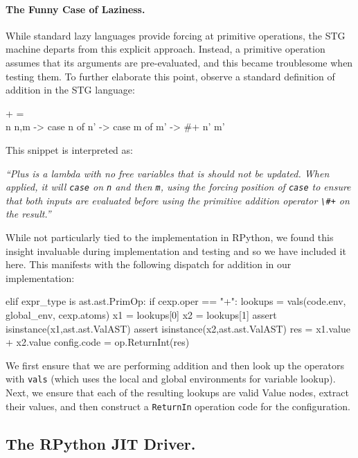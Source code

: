 \documentclass[preprint]{sigplanconf}
\begin{document}
\paragraph{The Funny Case of Laziness.}
While standard lazy languages provide forcing at primitive operations, the
STG machine departs from this explicit approach. Instead, a primitive operation
assumes that its arguments are pre-evaluated, and this became troublesome when
testing them. To further elaborate this point, observe a standard definition
of addition in the STG language:
\begin{code}[language=Haskell]
+ = \ {} \\n {n,m} -> case n of
                        n' -> case m of
                                m' -> #+ n' m'
\end{code}
This snippet is interpreted as: 
\begin{center}
\emph{
``Plus is a lambda with no free variables that
is should not be updated. When applied, it will \lstinline{case} on
\lstinline{n} and then \lstinline{m}, using the forcing position of
\lstinline{case} to ensure that both inputs are evaluated before using the
primitive addition operator \lstinline{\#+} on the result.''
}
\end{center}
While not particularly tied to the implementation in RPython, we found this
insight invaluable during implementation and testing and so we have included
it here. This manifests with the following dispatch for addition in our
implementation:
\begin{code}
elif expr_type is ast.ast.PrimOp:
  if cexp.oper == "+":
    lookups = vals(code.env,
                   global_env, 
                   cexp.atoms)
    x1      = lookups[0]
    x2      = lookups[1]
    assert isinstance(x1,ast.ast.ValAST)
    assert isinstance(x2,ast.ast.ValAST)
    res     = x1.value + x2.value
    config.code = op.ReturnInt(res) 
\end{code}
We first ensure that we are performing addition and then look up the operators
with \lstinline{vals} (which uses the local and global environments for variable
lookup). Next, we ensure that each of the resulting lookups are valid Value
nodes, extract their values, and then construct a \lstinline{ReturnIn} operation
code for the configuration.

\subsection{The RPython JIT Driver.}
\end{document}

